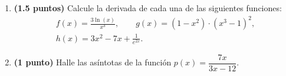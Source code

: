 
\begin{enumerate}[label=\alph*)]
\item \textbf{(1.5 puntos)} Calcule la derivada de cada una de las siguientes funciones:
\[
\begin{gathered}
f(x)=\frac{3\ln(x)}{x^3},\qquad g(x)=(1-x^2)\cdot(x^3-1)^2,\\[4pt]
h(x)=3x^2-7x+\frac{1}{e^{2x}}.
\end{gathered}
\]
\item \textbf{(1 punto)} Halle las asíntotas de la función $p(x)=\dfrac{7x}{3x-12}$.
\end{enumerate}
